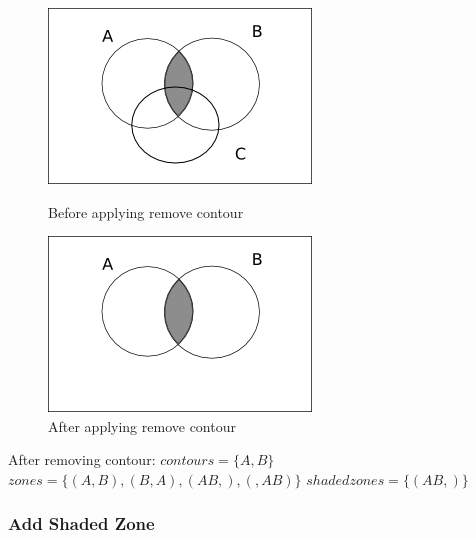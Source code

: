 \documentclass[10pt, a4paper, titlepage]{article}
\begin{document}
\begin{figure}[h]
\begin{minipage}[h]{0.5\linewidth}
\centering
\includegraphics[scale=0.5]{images/diag3add2.png}
\caption{Before applying remove contour}
\label{fig:add3}
\end{minipage}
\hspace{0.5cm}
\begin{minipage}[h]{0.5\linewidth}
\centering
\includegraphics[scale=0.5]{images/diag3add1.png}
\caption{After applying remove contour}
\label{fig:add4}
\end{minipage}
\end{figure}

After removing contour:\newline
$contours =  \lbrace A, B \rbrace $ \newline
$zones = \lbrace (A , B) , (B , A), (AB , ) , ( , AB) \rbrace  $ \newline 
$shaded zones = \lbrace (AB , ) \rbrace  $ \newline

\subsubsection{Add Shaded Zone}
\end{document}

